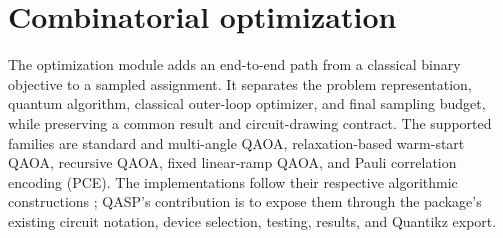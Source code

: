 \documentclass[10pt]{article}
\begin{document}
\section{Combinatorial optimization}
\label{sec:optimization}

The optimization module adds an end-to-end path from a classical binary
objective to a sampled assignment.  It separates the problem representation,
quantum algorithm, classical outer-loop optimizer, and final sampling budget,
while preserving a common result and circuit-drawing contract.  The supported
families are standard and multi-angle QAOA, relaxation-based warm-start QAOA,
recursive QAOA, fixed linear-ramp QAOA, and Pauli correlation encoding (PCE).
The implementations follow their respective algorithmic constructions
\cite{farhi2014qaoa,egger2021warm,bravyi2020rqaoa,herrman2022multiangle,
sciorilli2025pce,montanez2025lrqaoa}; QASP's contribution is to expose them
through the package's existing circuit notation, device selection, testing,
results, and Quantikz export.
\end{document}
